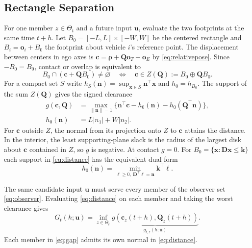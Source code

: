 \documentclass[journal]{IEEEtran}
\theoremstyle{definition}
\newcommand{\vct}[1]{\boldsymbol{#1}}
\newcommand{\mtx}[1]{\mathbf{#1}}
\begin{document}
\subsection{Rectangle Separation}
For one member $z\in\Theta_t$ and a future input $\vct u$, evaluate the
two footprints at the same time $t+h$. Let $B_0=[-L,L]\times[-W,W]$
be the centered rectangle and $B_i=\vct o_i+B_0$ the footprint about
vehicle $i$'s reference point. The displacement between centers in ego
axes is $\vct c=\vct\rho+\mtx Q\vct o_T-\vct o_E$ by \eqref{eq:relativepose}.
Since $-B_0=B_0$, contact or overlap is equivalent to
\begin{equation*}
 B_0\cap(\vct c+\mtx Q B_0)\ne\varnothing
 \quad\Longleftrightarrow\quad
 \vct c\in Z(\mtx Q):=B_0\oplus\mtx Q B_0 .
\end{equation*}
For a compact set $S$ write $h_S(\vct n)=\sup_{\vct x\in S}\vct n^\top\vct x$
and $h_0=h_{B_0}$. The support of the sum $Z(\mtx Q)$ gives the signed
clearance
\begin{equation}\label{eq:distance}
\begin{aligned}
 g(\vct c,\mtx Q)
 &=\max_{\|\vct n\|=1}
   \{\vct n^\top\vct c-h_0(\vct n)-h_0(\mtx Q^\top\vct n)\},\\
 h_0(\vct n)&=L|n_1|+W|n_2| .
\end{aligned}
\end{equation}
For $\vct c$ outside $Z$, the normal from its projection onto $Z$ to
$\vct c$ attains the distance. In the interior, the least supporting-plane
slack is the radius of the largest disk about $\vct c$ contained in $Z$,
so $g$ is negative. At contact $g=0$. For $B_0=\{\vct x:\mtx D\vct x
\le\vct k\}$ each support in \eqref{eq:distance} has the equivalent
dual form \cite{ZhangLinigerBorrelli2021}
\begin{equation*}
 h_0(\vct n)=\min_{\vct\ell\ge0,\ \mtx D^\top\vct\ell=\vct n}
                  \vct k^\top\vct\ell .
\end{equation*}

The same candidate input $\vct u$ must serve every member of the
observer set \eqref{eq:observer}. Evaluating \eqref{eq:distance} on
each member and taking the worst clearance gives
\begin{equation}\label{eq:gap}
 G_t(h;\vct u)=\inf_{z\in\Theta_t}
 \underbrace{g(\vct c_z(t+h),\mtx Q_z(t+h))}_{g_{t,z}(h;\vct u)} .
\end{equation}
Each member in \eqref{eq:gap} admits its own normal in \eqref{eq:distance}.
\end{document}
